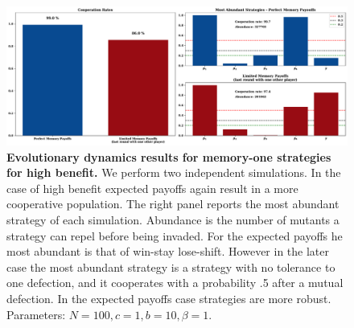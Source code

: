 \documentclass[11pt]{article}
\theoremstyle{plainCl1}
\theoremstyle{plainCl2}
\begin{document}
\begin{figure}[!htbp]
  \centering 
  \includegraphics[width=\textwidth]{static/memory_one_results_high_benefit.pdf}
  \caption{\textbf{Evolutionary dynamics results for memory-one strategies for high benefit.}
  We perform two independent simulations. In the case of high benefit expected
  payoffs again result in a more cooperative population. The right panel reports
  the most abundant strategy of each simulation. Abundance is the number of
  mutants a strategy can repel before being invaded. For the expected payoffs he
  most abundant is that of win-stay lose-shift. However in the later case the
  most abundant strategy is a strategy with no tolerance to one defection, and
  it cooperates with a probability .5 after a mutual defection.  In the expected
  payoffs case strategies are more robust.  Parameters: \(N =100, c=1, b=10,
  \beta=1\).}\label{fig:memory_one_high_benefit}
\end{figure}
\end{document}
